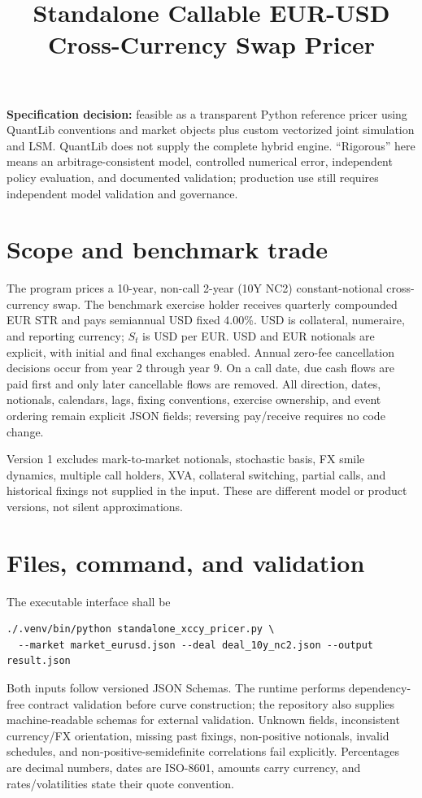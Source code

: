 \documentclass[conference]{IEEEtran}
\title{Standalone Callable EUR-USD Cross-Currency Swap Pricer}
\author{\TGIRArticleAuthorBlock}
\begin{document}
\maketitle

{\bfseries Specification decision:} feasible as a transparent Python reference pricer using QuantLib conventions and market objects plus custom vectorized joint simulation and LSM. QuantLib does not supply the complete hybrid engine. ``Rigorous'' here means an arbitrage-consistent model, controlled numerical error, independent policy evaluation, and documented validation; production use still requires independent model validation and governance.

\section{Scope and benchmark trade}

The program prices a 10-year, non-call 2-year (10Y NC2) constant-notional cross-currency swap. The benchmark exercise holder receives quarterly compounded EUR \texteuro STR and pays semiannual USD fixed 4.00\%. USD is collateral, numeraire, and reporting currency; $S_t$ is USD per EUR. USD and EUR notionals are explicit, with initial and final exchanges enabled. Annual zero-fee cancellation decisions occur from year 2 through year 9. On a call date, due cash flows are paid first and only later cancellable flows are removed. All direction, dates, notionals, calendars, lags, fixing conventions, exercise ownership, and event ordering remain explicit JSON fields; reversing pay/receive requires no code change.

Version 1 excludes mark-to-market notionals, stochastic basis, FX smile dynamics, multiple call holders, XVA, collateral switching, partial calls, and historical fixings not supplied in the input. These are different model or product versions, not silent approximations.

\section{Files, command, and validation}

The executable interface shall be
\begin{lstlisting}
./.venv/bin/python standalone_xccy_pricer.py \
  --market market_eurusd.json --deal deal_10y_nc2.json --output result.json
\end{lstlisting}
Both inputs follow versioned JSON Schemas. The runtime performs dependency-free contract validation before curve construction; the repository also supplies machine-readable schemas for external validation. Unknown fields, inconsistent currency/FX orientation, missing past fixings, non-positive notionals, invalid schedules, and non-positive-semidefinite correlations fail explicitly. Percentages are decimal numbers, dates are ISO-8601, amounts carry currency, and rates/volatilities state their quote convention.
\end{document}

